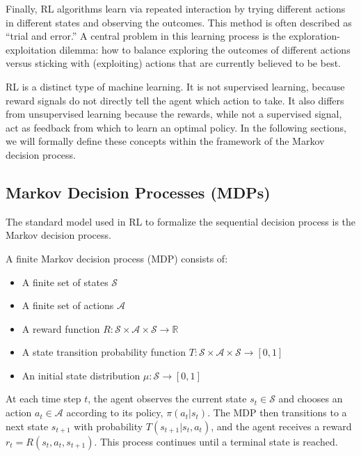 Finally, RL algorithms learn via repeated interaction by trying different actions in different states and observing the outcomes. This method is often described as “trial and error.” A central problem in this learning process is the exploration-exploitation dilemma: how to balance exploring the outcomes of different actions versus sticking with (exploiting) actions that are currently believed to be best.

RL is a distinct type of machine learning. It is not supervised learning, because reward signals do not directly tell the agent which action to take. It also differs from unsupervised learning because the rewards, while not a supervised signal, act as feedback from which to learn an optimal policy. In the following sections, we will formally define these concepts within the framework of the Markov decision process.

\subsection*{Markov Decision Processes (MDPs)}
The standard model used in RL to formalize the sequential decision process is the Markov decision process.

\begin{definition}
A finite Markov decision process (MDP) consists of:
\begin{itemize}
    \item A finite set of states $\mathcal{S}$
    \item A finite set of actions $\mathcal{A}$
    \item A reward function $R: \mathcal{S} \times \mathcal{A} \times\mathcal{S} \rightarrow \mathbb{R}$
    \item A state transition probability function $T: \mathcal{S} \times \mathcal{A} \times \mathcal{S} \rightarrow [0,1]$
    \item An initial state distribution $\mu: \mathcal{S} \rightarrow [0,1]$
\end{itemize}
\end{definition}

At each time step $t$, the agent observes the current state $s_t \in \mathcal{S}$ and chooses an action $a_t \in \mathcal{A}$ according to its policy, $\pi(a_t | s_t)$. The MDP then transitions to a next state $s_{t+1}$ with probability $T(s_{t+1} | s_t, a_t)$, and the agent receives a reward $r_t = R(s_t, a_t, s_{t+1})$. This process continues until a terminal state is reached.

